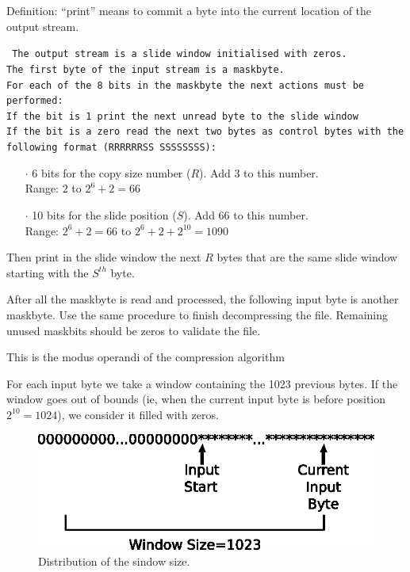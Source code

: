 \documentclass{article}
\begin{document}
 Definition: ``print'' means to commit a byte into the current location
             of the output stream.\\

{\tt
 The output stream is a slide window initialised with zeros.\\
 The first byte of the input stream is a maskbyte.\\
 For each of the 8 bits in the maskbyte the next actions must be performed:\\
  If the bit is 1 print the next unread byte to the slide window\\
  If the bit is a zero read the next two bytes as control bytes with the
  following format (RRRRRRSS SSSSSSSS):\\
\begin{itemize}
\item[$\cdot$] 6  bits for the copy size number ($R$). Add 3 to this number.\\
        Range: $2$ to $2^6+2=66$
\item[$\cdot$] 10 bits for the slide position ($S$). Add 66 to this number.\\
        Range: $2^6+2=66$ to $2^6+2+2^{10}=1090$
\end{itemize}
   Then print in the slide window the next $R$ bytes that are the same slide
   window starting with the $S^{th}$ byte.\\
}
 After all the maskbyte is read and processed, the following input byte is
 another maskbyte. Use the same procedure to finish decompressing the file.
 Remaining unused maskbits should be zeros to validate the file.

 This is the modus operandi of the compression algorithm

 For each input byte we take a window containing the 1023 previous bytes.
 If the window goes out of bounds (ie, when the current input byte is
 before position $2^{10}=1024$), we consider it filled with zeros.

\begin{figure}[h]
\centerline{\includegraphics{lzg.eps}}
\caption{Distribution of the sindow size.}
\end{figure}
\end{document}
